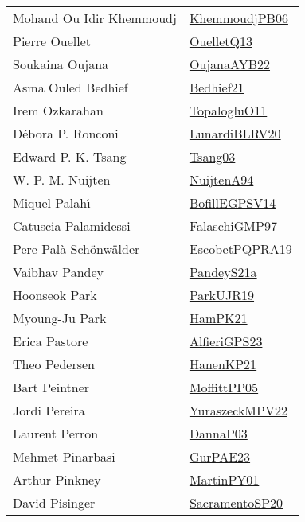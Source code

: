 {\begin{longtable}{p{4cm}p{20cm}}
Mohand Ou Idir Khemmoudj & \href{papers/KhemmoudjPB06.pdf}{KhemmoudjPB06}\cite{KhemmoudjPB06} \\
Pierre Ouellet & \href{papers/OuelletQ13.pdf}{OuelletQ13}\cite{OuelletQ13} \\
Soukaina Oujana & \href{papers/OujanaAYB22.pdf}{OujanaAYB22}\cite{OujanaAYB22} \\
Asma Ouled Bedhief & \href{articles/Bedhief21.pdf}{Bedhief21}\cite{Bedhief21} \\
Irem Ozkarahan & \href{articles/TopalogluO11.pdf}{TopalogluO11}\cite{TopalogluO11} \\
D{\'{e}}bora P. Ronconi & \href{articles/LunardiBLRV20.pdf}{LunardiBLRV20}\cite{LunardiBLRV20} \\
Edward P. K. Tsang & \href{articles/Tsang03.pdf}{Tsang03}\cite{Tsang03} \\
W. P. M. Nuijten & \href{}{NuijtenA94}\cite{NuijtenA94} \\
Miquel Palah{\'{\i}} & \href{papers/BofillEGPSV14.pdf}{BofillEGPSV14}\cite{BofillEGPSV14} \\
Catuscia Palamidessi & \href{articles/FalaschiGMP97.pdf}{FalaschiGMP97}\cite{FalaschiGMP97} \\
Pere Pal{\`{a}}{-}Sch{\"{o}}nw{\"{a}}lder & \href{articles/EscobetPQPRA19.pdf}{EscobetPQPRA19}\cite{EscobetPQPRA19} \\
Vaibhav Pandey & \href{articles/PandeyS21a.pdf}{PandeyS21a}\cite{PandeyS21a} \\
Hoonseok Park & \href{papers/ParkUJR19.pdf}{ParkUJR19}\cite{ParkUJR19} \\
Myoung-Ju Park & \href{articles/HamPK21.pdf}{HamPK21}\cite{HamPK21} \\
Erica Pastore & \href{articles/AlfieriGPS23.pdf}{AlfieriGPS23}\cite{AlfieriGPS23} \\
Theo Pedersen & \href{papers/HanenKP21.pdf}{HanenKP21}\cite{HanenKP21} \\
Bart Peintner & \href{papers/MoffittPP05.pdf}{MoffittPP05}\cite{MoffittPP05} \\
Jordi Pereira & \href{articles/YuraszeckMPV22.pdf}{YuraszeckMPV22}\cite{YuraszeckMPV22} \\
Laurent Perron & \href{papers/DannaP03.pdf}{DannaP03}\cite{DannaP03} \\
Mehmet Pinarbasi & \href{articles/GurPAE23.pdf}{GurPAE23}\cite{GurPAE23} \\
Arthur Pinkney & \href{articles/MartinPY01.pdf}{MartinPY01}\cite{MartinPY01} \\
David Pisinger & \href{articles/SacramentoSP20.pdf}{SacramentoSP20}\cite{SacramentoSP20} \\

\end{longtable}}
